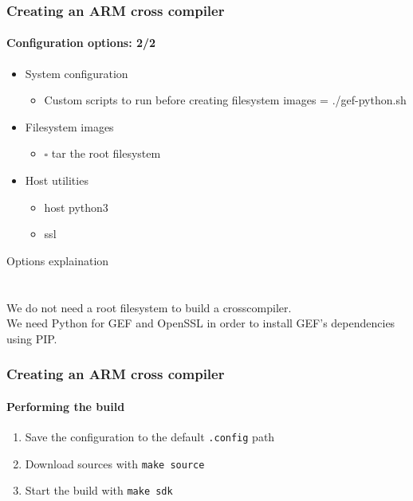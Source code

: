 {  \begin{frame}
    \frametitle{Creating an ARM cross compiler}
    \framesubtitle{Configuration options: 2/2}
    \begin{itemize}
      \toolchainOptionsList
      \item System configuration
      \begin{itemize}
        \item Custom scripts to run before creating filesystem images = ./gef-python.sh
      \end{itemize}
      \item Filesystem images
      \begin{itemize}
        \item $\square$ tar the root filesystem
      \end{itemize}
      \item Host utilities
      \begin{itemize}
        \item host python3
        \item ssl
      \end{itemize}
    \end{itemize}
  \end{frame}
   {
    Options explaination \\
    \toolchainOptionsDescription \\
    \gefPythonDescription \\
    We do not need a root filesystem to build a crosscompiler. \\
    We need Python for GEF and OpenSSL in order to install GEF's dependencies using PIP.
  }

  \begin{frame}
    \frametitle{Creating an ARM cross compiler}
    \framesubtitle{Performing the build}
    \begin{enumerate}
      \item Save the configuration to the default \texttt{.config} path
      \item Download sources with \texttt{make source}
      \item Start the build with \texttt{make sdk}
    \end{enumerate}
  \end{frame}
}
